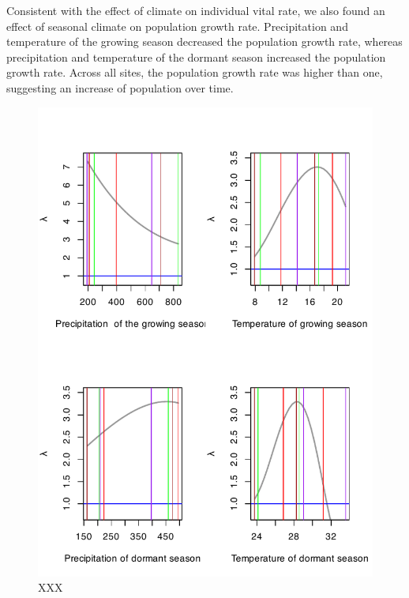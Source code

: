 \documentclass[11pt]{article}\usepackage[]{graphicx}\usepackage[usenames,dvipsnames]{xcolor}
\begin{document}
Consistent with the effect of climate on individual vital rate, we also found an effect of seasonal climate on population growth rate. Precipitation and temperature of the growing season decreased the population growth rate, whereas precipitation and temperature of the dormant season increased the population growth rate. Across all sites, the population growth rate was higher than one, suggesting an increase of population over time.

\begin{figure}%
  \begin{center}
    \includegraphics[width=0.95\linewidth]{Figures/all_lambda.pdf}
  \caption{XXX}
  \label{fig:vital_rates}
  \end{center}
\end{figure}


\newpage
\end{document}
